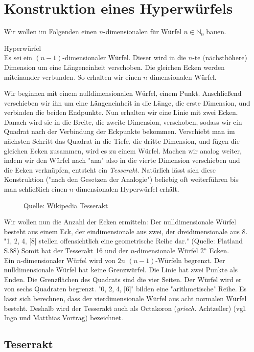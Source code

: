 \section{Konstruktion eines Hyperwürfels}
Wir wollen im Folgenden einen $n$-dimensionalen für Würfel $n\in \mathbb{N}_0$ bauen.
\begin{definition} {Hyperwürfel}
\\ Es sei ein $(n-1)$-dimensionaler Würfel. Dieser wird in die $n$-te (nächsthöhere) Dimension um eine Längeneinheit verschoben. Die gleichen Ecken werden miteinander verbunden. So erhalten wir einen $n$-dimensionalen Würfel.
\end{definition}

Wir beginnen mit einem nulldimensionalen Würfel, einem Punkt.
Anschließend verschieben wir ihn um eine Längeneinheit in die Länge, die erste Dimension, und verbinden die beiden Endpunkte. Nun erhalten wir eine Linie mit zwei Ecken. 
Danach wird sie in die Breite, die zweite Dimension, verschoben, sodass wir ein Quadrat nach der Verbindung der Eckpunkte bekommen. Verschiebt man im nächsten Schritt das Quadrat in die Tiefe, die dritte Dimension, und fügen die gleichen Ecken zusammen, wird es zu einem Würfel. Machen wir analog weiter, indem wir den Würfel nach "ana" also in die vierte Dimension verschieben und die Ecken verknüpfen,  entsteht ein \emph{Tesserakt}. Natürlich lässt sich diese Konstruktion ("nach den Gesetzen der Analogie") beliebig oft weiterführen bis man schließlich einen $n$-dimensionalen Hyperwürfel erhält. 
\begin{figure}[h]
\centering

\caption{Quelle: Wikipedia Tesserakt}
\label{Wuerfel}
\end{figure}

\indent Wir wollen nun die Anzahl der Ecken ermitteln: Der nulldimensionale Würfel besteht aus einem Eck, der eindimensionale aus zwei, der dreidimensionale aus 8. "1, 2, 4, [8] stellen offensichtlich eine geometrische Reihe dar." (Quelle: Flatland S.88) Somit hat der Tesserakt 16 und der $n$-dimensionale Würfel $2^n$ Ecken. 
\\ \indent Ein $n$-dimensionaler Würfel wird von $2n$ $(n-1)$-Würfeln begrenzt. Der nulldimensionale Würfel hat keine Grenzwürfel. Die Linie hat zwei Punkte als Enden. Die Grenzflächen des Quadrats sind die vier Seiten. Der Würfel wird er von sechs Quadraten begrenzt. "0, 2, 4, [6]" bilden eine "arithmetische" Reihe. Es lässt sich berechnen, dass der vierdimensionale Würfel aus acht normalen Würfel besteht. Deshalb wird der Tesserakt auch als Octakoron (\textit{griech.} Achtzeller) (vgl. Ingo und Matthias Vortrag) bezeichnet.



\subsection*{Teserrakt}

